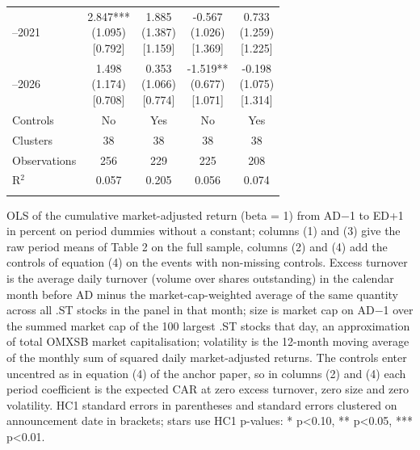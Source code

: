 \begin{threeparttable}
\begin{tabular}{@{}lcccc}
\addlinespace[0.25ex]
\addlinespace[0.25ex]
2017–2021 & \makecell{2.847*** \\ (1.095) \\{}[0.792]} & \makecell{1.885 \\ (1.387) \\{}[1.159]} & \makecell{-0.567 \\ (1.026) \\{}[1.369]} & \makecell{0.733 \\ (1.259) \\{}[1.225]} \\
\addlinespace[0.25ex]
\addlinespace[0.25ex]
2022–2026 & \makecell{1.498 \\ (1.174) \\{}[0.708]} & \makecell{0.353 \\ (1.066) \\{}[0.774]} & \makecell{-1.519** \\ (0.677) \\{}[1.071]} & \makecell{-0.198 \\ (1.075) \\{}[1.314]} \\
\addlinespace[0.25ex]
\midrule
\addlinespace[1ex]
Controls & No & Yes & No & Yes \\
\addlinespace[0.25ex]
\addlinespace[0.25ex]
Clusters & 38 & 38 & 38 & 38 \\
\addlinespace[0.25ex]
\addlinespace[0.25ex]
Observations & 256 & 229 & 225 & 208 \\
\addlinespace[0.25ex]
\addlinespace[0.25ex]
R$^2$ & 0.057 & 0.205 & 0.056 & 0.074 \\
\addlinespace[0.25ex]
\bottomrule
\end{tabular}
\endgroup
\noindent\begin{minipage}{\linewidth}\smallskip\footnotesize
OLS of the cumulative market-adjusted return (beta = 1) from AD$-$1 to ED+1 in percent on period dummies without a constant; columns (1) and (3) give the raw period means of Table 2 on the full sample, columns (2) and (4) add the controls of equation (4) on the events with non-missing controls. Excess turnover is the average daily turnover (volume over shares outstanding) in the calendar month before AD minus the market-cap-weighted average of the same quantity across all .ST stocks in the panel in that month; size is market cap on AD$-$1 over the summed market cap of the 100 largest .ST stocks that day, an approximation of total OMXSB market capitalisation; volatility is the 12-month moving average of the monthly sum of squared daily market-adjusted returns. The controls enter uncentred as in equation (4) of the anchor paper, so in columns (2) and (4) each period coefficient is the expected CAR at zero excess turnover, zero size and zero volatility. HC1 standard errors in parentheses and standard errors clustered on announcement date in brackets; stars use HC1 p-values: * p<0.10, ** p<0.05, *** p<0.01.\end{minipage}

\end{threeparttable}